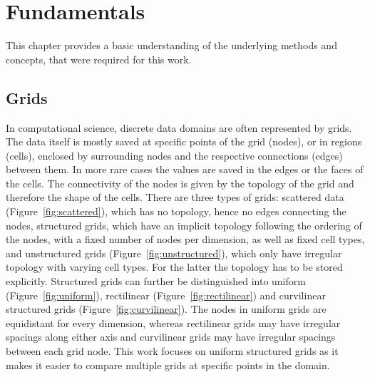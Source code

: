 \chapter{Fundamentals}

This chapter provides a basic understanding of the underlying methods
and concepts, that were required for this work.

\section{Grids}

In computational science, discrete data domains are often represented by
grids. The data itself is mostly saved at specific points of the grid
(nodes), or in regions (cells), enclosed by surrounding nodes and the
respective connections (edges) between them. In more rare cases the
values are saved in the edges or the faces of the cells. The
connectivity of the nodes is given by the topology of the grid and
therefore the shape of the cells. There are three types of grids:
scattered data (Figure~\ref{fig:scattered}), which has no topology,
hence no edges connecting the nodes, structured grids, which have an
implicit topology following the ordering of the nodes, with a fixed
number of nodes per dimension, as well as fixed cell types, and
unstructured grids (Figure~\ref{fig:unstructured}), which only have
irregular topology with varying cell types. For the latter the topology
has to be stored explicitly. Structured grids can further be
distinguished into uniform (Figure~\ref{fig:uniform}), rectilinear
(Figure~\ref{fig:rectilinear}) and curvilinear structured grids
(Figure~\ref{fig:curvilinear}). The nodes in uniform grids are
equidistant for every dimension, whereas rectilinear grids may have
irregular spacings along either axis and curvilinear grids may have
irregular spacings between each grid node. This work focuses on uniform
structured grids as it makes it easier to compare multiple grids at
specific points in the domain.


